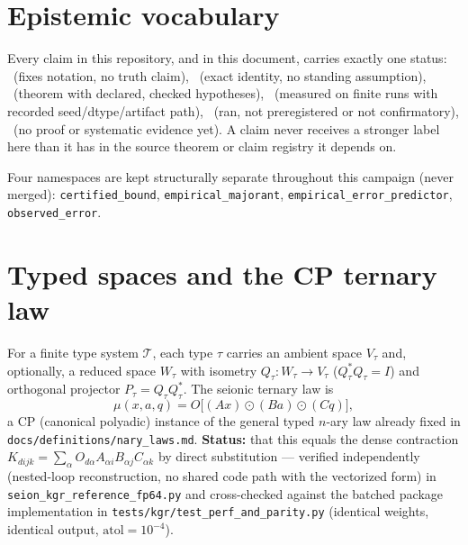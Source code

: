 \documentclass[11pt]{article}
\title{}
\begin{document}

\tableofcontents

\section{Epistemic vocabulary}
Every claim in this repository, and in this document, carries exactly one status:
\DefC\ (fixes notation, no truth claim), \Proved\ (exact identity, no standing assumption),
\ProvedU\ (theorem with declared, checked hypotheses), \NumTested\ (measured on finite runs
with recorded seed/dtype/artifact path), \Explor\ (ran, not preregistered or not confirmatory),
\OpenC\ (no proof or systematic evidence yet). A claim never receives a stronger label here
than it has in the source theorem or claim registry it depends on.

Four namespaces are kept structurally separate throughout this campaign (never merged):
\texttt{certified\_bound}, \texttt{empirical\_majorant}, \texttt{empirical\_error\_predictor},
\texttt{observed\_error}.

\section{Typed spaces and the CP ternary law}
For a finite type system $\mathcal T$, each type $\tau$ carries an ambient space $V_\tau$ and,
optionally, a reduced space $W_\tau$ with isometry $Q_\tau: W_\tau \to V_\tau$
($Q_\tau^*Q_\tau = I$) and orthogonal projector $P_\tau = Q_\tau Q_\tau^*$. The seionic ternary
law is
\[
  \mu(x,a,q) = O\big[(Ax) \odot (Ba) \odot (Cq)\big],
\]
a CP (canonical polyadic) instance of the general typed $n$-ary law already fixed in
\texttt{docs/definitions/nary\_laws.md}. \textbf{Status: \Proved} that this equals the dense
contraction $K_{d ijk} = \sum_\alpha O_{d\alpha}A_{\alpha i}B_{\alpha j}C_{\alpha k}$ by direct
substitution --- verified independently (nested-loop reconstruction, no shared code path with the
vectorized form) in \texttt{seion\_kgr\_reference\_fp64.py} and cross-checked against the batched
package implementation in \texttt{tests/kgr/test\_perf\_and\_parity.py} (identical weights,
identical output, $\mathrm{atol}=10^{-4}$).
\end{document}
